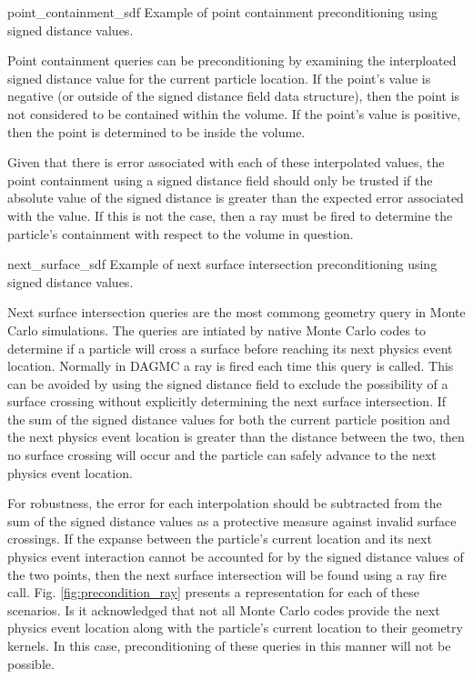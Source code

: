               {point_containment_sdf}
              {Example of point containment preconditioning using signed distance values.}
              {
                Point containment queries can be preconditioning by examining the interploated
                signed distance value for the current particle location. If the point's value
                is negative (or outside of the signed distance field data structure), then the
                point is not considered to be contained within the volume. If the point's value is positive,
                then the point is determined to be inside the volume.

                Given that there is error associated with each of these interpolated values,
                the point containment using a signed distance field should only be trusted if
                the absolute value of the signed distance is greater than the expected error
                associated with the value. If this is not the case, then a ray must be fired
                to determine the particle's containment with respect to the volume in
                question.
              }

              {next_surface_sdf}
              {Example of next surface intersection preconditioning using signed distance values.}
              {
                Next surface intersection queries are the most commong geometry query in Monte
                Carlo simulations. The queries are intiated by native Monte Carlo codes to
                determine if a particle will cross a surface before reaching its next physics
                event location. Normally in DAGMC a ray is fired each time this query is
                called. This can be avoided by using the signed distance field to exclude the
                possibility of a surface crossing without explicitly determining the next
                surface intersection. If the sum of the signed distance values for both the
                current particle position and the next physics event location is greater than
                the distance between the two, then no surface crossing will occur and the
                particle can safely advance to the next physics event location.
                
                For robustness, the error for each interpolation should be subtracted from the
                sum of the signed distance values as a protective measure against invalid
                surface crossings. If the expanse between the particle's current location and
                its next physics event interaction cannot be accounted for by the signed
                distance values of the two points, then the next surface intersection will be
                found using a ray fire call. Fig. \ref{fig:precondition_ray} presents a
                representation for each of these scenarios. Is it acknowledged that not all
                Monte Carlo codes provide the next physics event location along with the
                particle's current location to their geometry kernels. In this case,
                preconditioning of these queries in this manner will not be possible.
              }

